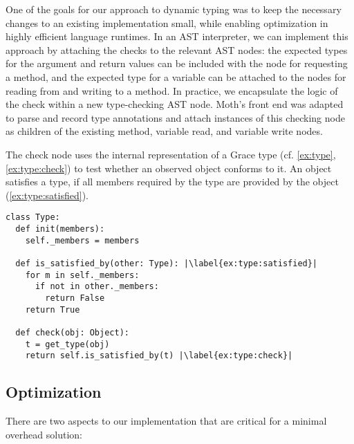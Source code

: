
One of the goals for our approach to dynamic typing was to keep
the necessary changes to an existing implementation small,
while enabling optimization in highly efficient language runtimes.
%
In an AST interpreter, we can implement this approach by attaching the
checks to the relevant AST nodes: the expected types for the argument
and return values can be included with the node for requesting a
method, and the expected type for a variable can be attached to the
nodes for reading from and writing to a method.  In practice, we
encapsulate the logic of the check within a new type-checking AST
node.  Moth's front end was adapted to parse and record type
annotations and attach instances of this checking node as children of the
existing method, variable read, and variable write nodes.



%

The check node uses the internal representation of a Grace type
(cf. \cref{ex:type}, \cref{ex:type:check}) to test whether an observed
object conforms to it. 
An object satisfies a type, if all members required by the type are provided
by the object (\cref{ex:type:satisfied}).


\begin{lstlisting}[label={ex:type},escapechar=|,caption={Sketch of a \code{Type} in our system and its \code{check()} semantics.},float,floatplacement=htb,columns=flexible]
class Type:
  def init(members):
    self._members = members

  def is_satisfied_by(other: Type): |\label{ex:type:satisfied}|
    for m in self._members:
      if not in other._members:
        return False
    return True

  def check(obj: Object):
    t = get_type(obj)
    return self.is_satisfied_by(t) |\label{ex:type:check}|
\end{lstlisting}


\subsection{Optimization}
\label{ssec:optimization}

There are two aspects to our implementation that are critical for a minimal overhead solution:

